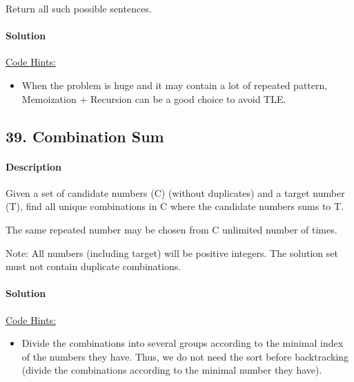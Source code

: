 Return all such possible sentences.

\paragraph{\color{white} \colorbox{OliveGreen}{Solution}}
\underline{Code Hints:}
\begin{itemize}
    \item When the problem is huge and it may contain a lot of repeated pattern, Memoization + Recursion can be a good choice to avoid TLE.
\end{itemize}

\subsection{39. Combination Sum}

\paragraph{\color{white} \colorbox{Mahogany}{Description}}
Given a set of candidate numbers (C) (without duplicates) and a target number (T), find all unique combinations in C where the candidate numbers sums to T.

The same repeated number may be chosen from C unlimited number of times.

Note:
All numbers (including target) will be positive integers.
The solution set must not contain duplicate combinations.

\paragraph{\color{white} \colorbox{OliveGreen}{Solution}}
\underline{Code Hints:}
\begin{itemize}
    \item Divide the combinations into several groups according to the minimal index of the numbers they have. Thus, we do not need the sort before backtracking (divide the combinations according to the minimal number they have).
\end{itemize}